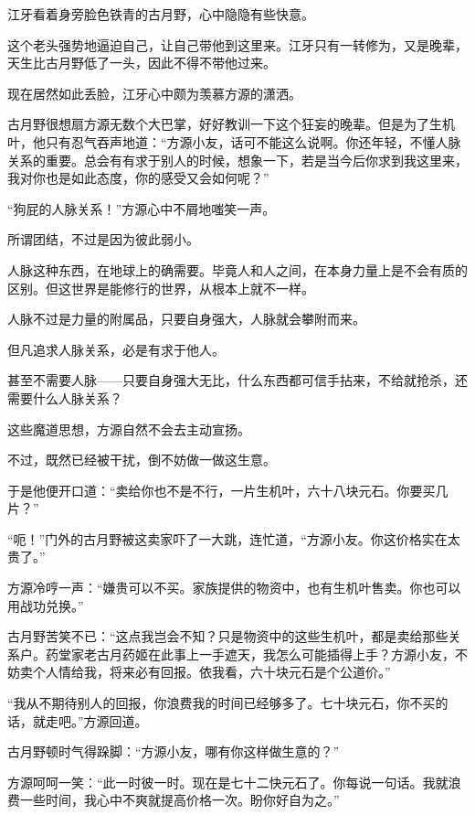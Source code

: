 
\begin{this_body}



江牙看着身旁脸色铁青的古月野，心中隐隐有些快意。

这个老头强势地逼迫自己，让自己带他到这里来。江牙只有一转修为，又是晚辈，天生比古月野低了一头，因此不得不带他过来。

现在居然如此丢脸，江牙心中颇为羡慕方源的潇洒。

古月野很想扇方源无数个大巴掌，好好教训一下这个狂妄的晚辈。但是为了生机叶，他只有忍气吞声地道：“方源小友，话可不能这么说啊。你还年轻，不懂人脉关系的重要。总会有有求于别人的时候，想象一下，若是当今后你求到我这里来，我对你也是如此态度，你的感受又会如何呢？”

“狗屁的人脉关系！”方源心中不屑地嗤笑一声。

所谓团结，不过是因为彼此弱小。

人脉这种东西，在地球上的确需要。毕竟人和人之间，在本身力量上是不会有质的区别。但这世界是能修行的世界，从根本上就不一样。

人脉不过是力量的附属品，只要自身强大，人脉就会攀附而来。

但凡追求人脉关系，必是有求于他人。

甚至不需要人脉——只要自身强大无比，什么东西都可信手拈来，不给就抢杀，还需要什么人脉关系？

这些魔道思想，方源自然不会去主动宣扬。

不过，既然已经被干扰，倒不妨做一做这生意。

于是他便开口道：“卖给你也不是不行，一片生机叶，六十八块元石。你要买几片？”

“呃！”门外的古月野被这卖家吓了一大跳，连忙道，“方源小友。你这价格实在太贵了。”

方源冷哼一声：“嫌贵可以不买。家族提供的物资中，也有生机叶售卖。你也可以用战功兑换。”

古月野苦笑不已：“这点我岂会不知？只是物资中的这些生机叶，都是卖给那些关系户。药堂家老古月药姬在此事上一手遮天，我怎么可能插得上手？方源小友，不妨卖个人情给我，将来必有回报。依我看，六十块元石是个公道价。”

“我从不期待别人的回报，你浪费我的时间已经够多了。七十块元石，你不买的话，就走吧。”方源回道。

古月野顿时气得跺脚：“方源小友，哪有你这样做生意的？”

方源呵呵一笑：“此一时彼一时。现在是七十二快元石了。你每说一句话。我就浪费一些时间，我心中不爽就提高价格一次。盼你好自为之。”


\end{this_body}
